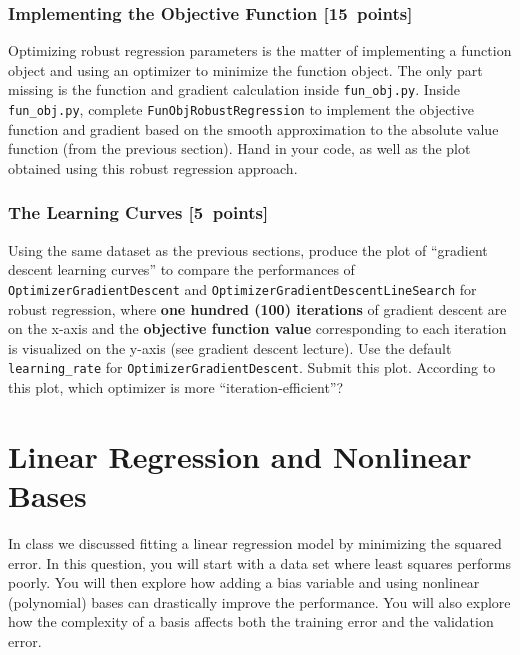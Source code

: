 \documentclass{article}
\newcommand{\blu}[1]{{\textcolor{blu}{#1}}}
\let\ask\blu
\newcommand\pts[1]{\textcolor{pointscolour}{[#1~points]}}
\begin{document}
\subsubsection{Implementing the Objective Function \pts{15}}

Optimizing robust regression parameters is the matter of implementing a function object and using an optimizer to minimize the function object. The only part missing is the function and gradient calculation inside \texttt{fun\_obj.py}.
\ask{Inside \texttt{fun\_obj.py}, complete \texttt{FunObjRobustRegression} to implement the objective function and gradient based on the smooth
approximation to the absolute value function (from the previous section). Hand in your code, as well
as the plot obtained using this robust regression approach.}




\subsubsection{The Learning Curves \pts{5}}

Using the same dataset as the previous sections, produce the plot of ``gradient descent learning curves'' to compare the performances of \texttt{OptimizerGradientDescent} and \texttt{OptimizerGradientDescentLineSearch} for robust regression, where \textbf{one hundred (100) iterations} of gradient descent are on the x-axis and the \textbf{objective function value} corresponding to each iteration is visualized on the y-axis (see gradient descent lecture). Use the default \texttt{learning\_rate} for \texttt{OptimizerGradientDescent}. \ask{Submit this plot. According to this plot, which optimizer is more ``iteration-efficient''?}

%

\clearpage
\section{Linear Regression and Nonlinear Bases}

In class we discussed fitting a linear regression model by minimizing the squared error.
In this question, you will start with a data set where least squares performs poorly.
You will then explore how adding a bias variable and using nonlinear (polynomial) bases can drastically improve the performance.
You will also explore how the complexity of a basis affects both the training error and the validation error.
\end{document}
